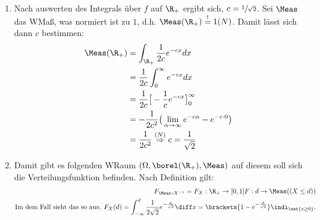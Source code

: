 \begin{lösung}
	\begin{enumerate}[label=\alph*)]
		\item Nach auswerten des Integrals über $f$ auf $\R_{+}$ ergibt sich, $c = \sfrac{1}{\sqrt{2}}$.
		Sei $\Meas$ das WMaß, was normiert ist zu $1$, d.h. $\Meas(\R_{+}) \overset{!}{=}1 (N)$. Damit lässt sich dann $c$ bestimmen:
		\begin{align*}
			\Meas(\R_{+}) &= \int_{\R_{+}} \frac{1}{2c} e^{-cx} dx\\
			&= \frac{1}{2c} \int_{0}^{\infty}  e^{-cx} dx \\
			&= \frac{1}{2c} \big[-\frac{1}{c} e^{-cx}\big]_{0}^{\infty}\\
			&= -\frac{1}{2c^2} \big(\lim\limits_{\alpha \to \infty} e^{-c\alpha} - e^{-c\cdot0}\big)\\
			&= \frac{1}{2c^2} \overset{(N)}{\Rightarrow} c = \frac{1}{\sqrt{2}} 
		\end{align*}
		\item Damit gibt es folgenden WRaum $(\Omega, \borel(\R_{+}),\Meas)$ auf diesem soll sich die Verteilungsfunktion befinden. Nach Definition gilt: 
		\begin{align*}
			F_{\Meas \circ X^{-1}} = F_{X}: \R_{+} \to [0,1] \mit F: d \to \Meas((X \le d))\notag\\
			\text{Im dem Fall sieht das so aus: } F_{X}(d) = \int_{-\infty}^{d} \frac{1}{2\sqrt{2}} e^{-\frac{x}{\sqrt{2}}} \diff x = \brackets{1 - e^{-\frac{d}{\sqrt{2}}}}\indi_{\set{x \ge 0}}.\notag\\
		\end{align*}
	\end{enumerate}
\end{lösung}


